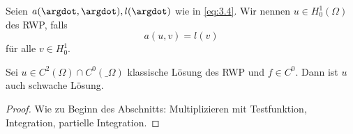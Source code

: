 \begin{df} \label{3.24}
	Seien $a(\argdot, \argdot), l(\argdot)$ wie in \eqref{eq:3.4}.
	Wir nennen $u \in H_0^1(\Omega)$  des RWP, falls
	\begin{equation} \label{eq:3.5}
		a(u,v) = l(v)
	\end{equation}
	für alle $v \in H_0^1$.
\end{df}

\begin{st} \label{3.25}
	Sei $u \in C^2(\Omega) \cap C^0(\_\Omega)$ klassische Lösung des RWP und $f \in C^0$.
	Dann ist $u$ auch schwache Lösung.
	\begin{proof}
		Wie zu Beginn des Abschnitts:
		Multiplizieren mit Testfunktion, Integration, partielle Integration.
	\end{proof}
\end{st}

